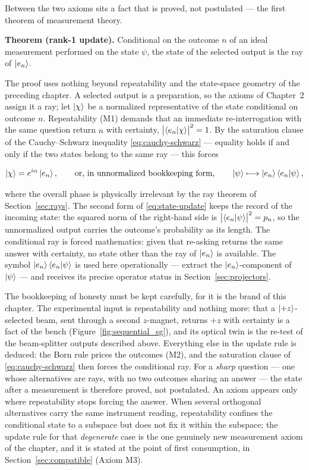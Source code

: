 Between the two axioms sits a fact that is proved, not postulated --- the first theorem of measurement theory.

\textbf{Theorem (rank-1 update).} Conditional on the outcome $n$ of an ideal measurement performed on the state $\psi$, the state of the selected output is the ray of $\ket{e_n}$.

The proof uses nothing beyond repeatability and the state-space geometry of the preceding chapter. A selected output is a preparation, so the axioms of Chapter~2 assign it a ray; let $\ket{\chi}$ be a normalized representative of the state conditional on outcome $n$. Repeatability (M1) demands that an immediate re-interrogation with the same question return $n$ with certainty, $\bigl|\braket{e_n|\chi}\bigr|^2 = 1$. By the saturation clause of the Cauchy--Schwarz inequality \eqref{eq:cauchy-schwarz} --- equality holds if and only if the two states belong to the same ray --- this forces
\begin{linenomath}
    \begin{equation}
        \ket{\chi} = e^{i\alpha}\ket{e_n},
        \qquad\text{or, in unnormalized bookkeeping form,}\qquad
        \ket{\psi} \longmapsto \ket{e_n}\braket{e_n|\psi} ,
        \label{eq:state-update}
    \end{equation}
\end{linenomath}
where the overall phase is physically irrelevant by the ray theorem of Section~\ref{sec:rays}. The second form of \eqref{eq:state-update} keeps the record of the incoming state: the squared norm of the right-hand side is $\bigl|\braket{e_n|\psi}\bigr|^2 = p_n$, so the unnormalized output carries the outcome's probability as its length. The conditional ray is forced mathematics: given that re-asking returns the same answer with certainty, no state other than the ray of $\ket{e_n}$ is available. The symbol $\ket{e_n}\braket{e_n|\psi}$ is used here operationally --- extract the $\ket{e_n}$-component of $\ket{\psi}$ --- and receives its precise operator status in Section~\ref{sec:projectors}.

The bookkeeping of honesty must be kept carefully, for it is the brand of this chapter. The experimental input is repeatability and nothing more: that a $\ket{+z}$-selected beam, sent through a second $z$-magnet, returns $+z$ with certainty is a fact of the bench (Figure~\ref{fig:sequential_sg}), and its optical twin is the re-test of the beam-splitter outputs described above. Everything else in the update rule is deduced: the Born rule prices the outcomes (M2), and the saturation clause of \eqref{eq:cauchy-schwarz} then forces the conditional ray. For a \emph{sharp} question --- one whose alternatives are rays, with no two outcomes sharing an answer --- the state after a measurement is therefore proved, not postulated. An axiom appears only where repeatability stops forcing the answer. When several orthogonal alternatives carry the same instrument reading, repeatability confines the conditional state to a subspace but does not fix it within the subspace; the update rule for that \emph{degenerate} case is the one genuinely new measurement axiom of the chapter, and it is stated at the point of first consumption, in Section~\ref{sec:compatible} (Axiom M3).

